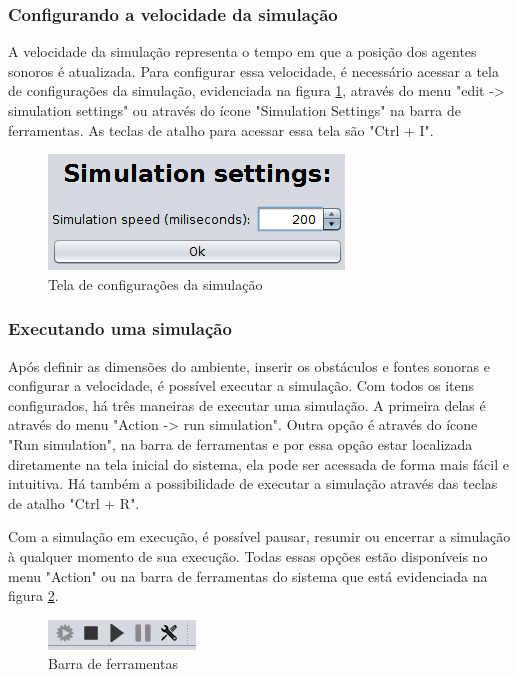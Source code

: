 \subsubsection{Configurando a velocidade da simulação}

A velocidade da simulação representa o tempo em que a posição dos agentes sonoros é atualizada. Para configurar essa velocidade, é necessário acessar a tela de configurações da simulação, evidenciada na figura \ref{settings}, através do menu "edit -> simulation settings" ou através do ícone "Simulation Settings" na barra de ferramentas. As teclas de atalho para acessar essa tela são "Ctrl + I".

\begin{figure}[!htb]
\centering
\includegraphics[scale=0.6]{figuras/telas/simulation_settings}
\caption{Tela de configurações da simulação}
\label{settings}
\end{figure}

\subsubsection{Executando uma simulação}

Após definir as dimensões do ambiente, inserir os obstáculos e fontes sonoras e configurar a velocidade, é possível executar a simulação. Com todos os itens configurados, há três maneiras de executar uma simulação. A primeira delas é através do menu "Action -> run simulation". Outra opção é através do ícone "Run simulation", na barra de ferramentas e por essa opção estar localizada diretamente na tela inicial do sistema, ela pode ser acessada de forma mais fácil e intuitiva. Há também a possibilidade de executar a simulação através das teclas de atalho "Ctrl + R".

Com a simulação em execução, é possível pausar, resumir ou encerrar a simulação à qualquer momento de sua execução. Todas essas opções estão disponíveis no menu "Action" ou na barra de ferramentas do sistema que está evidenciada na figura \ref{toolbar}.

\begin{figure}[!htb]
\centering
\includegraphics[scale=0.6]{figuras/telas/toolbar}
\caption{Barra de ferramentas}
\label{toolbar}
\end{figure}

